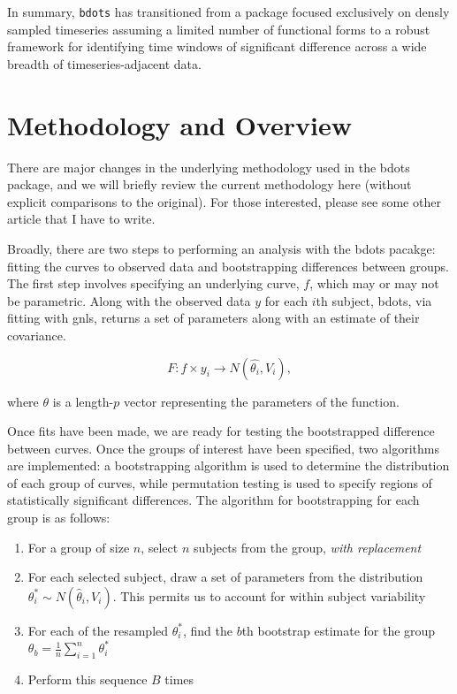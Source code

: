 \documentclass{article}
\begin{document}
In summary, \texttt{bdots} has transitioned from a package focused exclusively on densly sampled timeseries assuming a limited number of functional forms to a robust framework for identifying time windows of significant difference across a wide breadth of timeseries-adjacent data. 


\section{Methodology and Overview} 

There are major changes in the underlying methodology used in the bdots package, and we will briefly review the current methodology here (without explicit comparisons to the original). For those interested, please see some other article that I have to write.

Broadly, there are two steps to performing an analysis with the bdots pacakge: fitting the curves to observed data and bootstrapping differences between groups. The first step involves specifying an underlying curve, $f$, which may or may not be parametric. Along with the observed data $y$ for each $i$th subject, bdots, via fitting with gnls, returns a set of parameters along with an estimate of their covariance.

\begin{equation}
F: f \times y_i \rightarrow N(\hat{\theta_i}, V_{i}),
\end{equation}

where $\theta$ is a length-$p$ vector representing the parameters of the function.


Once fits have been made, we are ready for testing the bootstrapped difference between curves. Once the groups of interest have been specified, two algorithms are implemented: a bootstrapping algorithm is used to determine the distribution of each group of curves, while permutation testing is used to specify regions of statistically significant differences. The algorithm for  bootstrapping for each group is as follows:

\begin{enumerate}
\item For a group of size $n$, select $n$ subjects from the group, \textit{with replacement}
\item For each selected subject, draw a set of parameters from the distribution $\theta_{i}^* \sim N(\hat{\theta}_i, V_i)$. This permits us to account for within subject variability
\item For each of the resampled $\theta_i^*$, find the $b$th bootstrap estimate for the group $\theta_b = \frac1n \sum_{i=1}^n \theta_i^*$
\item Perform this sequence $B$ times
\end{enumerate}
\end{document}
